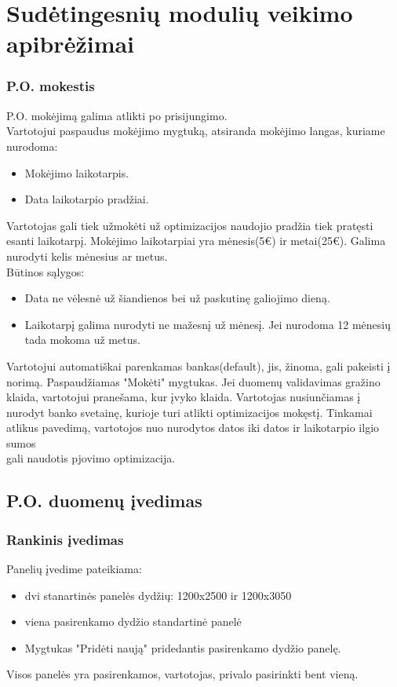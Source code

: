 \documentclass[a4paper,12pt]{article}
\begin{document}
\section{Sudėtingesnių modulių veikimo apibrėžimai}

\subsubsection{P.O. mokestis}
P.O. mokėjimą galima atlikti po prisijungimo. \\
Vartotojui paspaudus mokėjimo mygtuką, atsiranda mokėjimo langas, kuriame nurodoma:
\begin{itemize}
	\item Mokėjimo laikotarpis.
	\item Data laikotarpio pradžiai. 
\end{itemize} 

Vartotojas gali tiek užmokėti už optimizacijos naudojio pradžia tiek pratęsti esanti laikotarpį.
Mokėjimo laikotarpiai yra mėnesis(5€) ir metai(25€). Galima nurodyti kelis mėnesius ar metus. \\
Būtinos sąlygos:
\begin{itemize}
	\item Data ne vėlesnė už šiandienos bei už paskutinę galiojimo dieną.
	\item Laikotarpį galima nurodyti ne mažesnį už mėnesį. Jei nurodoma 12 mėnesių tada mokoma už metus.
\end{itemize}

Vartotojui automatiškai parenkamas bankas(default), jis, žinoma, gali pakeisti į norimą.
Paspaudžiamas "Mokėti" mygtukas.
Jei duomenų validavimas gražino klaida, vartotojui pranešama, kur įvyko klaida.
Vartotojas nusiunčiamas į nurodyt banko svetainę, kurioje turi atlikti optimizacijos mokęstį.
Tinkamai atlikus pavedimą, vartotojos nuo nurodytos datos iki datos ir laikotarpio ilgio sumos\\
gali naudotis pjovimo optimizacija.
	
\subsection{ P.O. duomenų įvedimas }

\subsubsection{Rankinis įvedimas}

Panelių įvedime pateikiama:
\begin{itemize}
	\item dvi stanartinės panelės dydžių: 1200x2500 ir 1200x3050
	\item viena pasirenkamo dydžio standartinė panelė
	\item Mygtukas "Pridėti naują" pridedantis pasirenkamo dydžio panelę. 
\end{itemize} 
Visos panelės yra pasirenkamos, vartotojas, privalo pasirinkti bent vieną.
\end{document}
